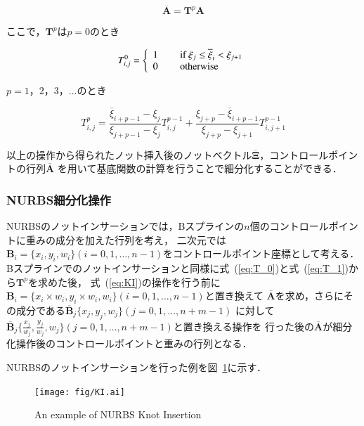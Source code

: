\begin{equation}
  \overline{\boldsymbol{A}} = \boldsymbol{T}^p\boldsymbol{A}
  \label{eq:KI}
\end{equation}

\noindent
ここで，$\boldsymbol{T}^p$は$p = 0$のとき

\begin{equation}
  T^0_{i,j} = \left \{
  \begin{array}{l}
    1    \ \qquad $if$\  \xi_{j} \leq \overline{\xi}_i < \xi_{j + 1} \\
    0    \ \qquad $otherwise$
  \end{array}
  \right.
  \label{eq:T_0}
\end{equation}

\noindent
$p = 1，2，3，\dots$のとき

\begin{equation}
  T^p_{i,j} = \frac{\overline{\xi}_{i+p-1} - \xi_j}{\xi_{j+p-1} - \xi_j}T^{p-1}_{i,j} 
  + \frac{\xi_{j+p} - \overline{\xi}_{i+p-1}}{\xi_{j+p} - \xi_{j + 1}}T^{p-1}_{i,j+1}
  \label{eq:T_1}
\end{equation}

\noindent
以上の操作から得られたノット挿入後のノットベクトル$\overline{\boldsymbol{\Xi}}$，コントロールポイントの行列$\overline{\boldsymbol{A}}$
を用いて基底関数の計算を行うことで細分化することができる．

\subsubsection{NURBS細分化操作}
NURBSのノットインサーションでは，Bスプラインの$n$個のコントロールポイントに重みの成分を加えた行列を考え，
二次元では$\boldsymbol{B}_i = \{x_i, y_i, w_i\}(i=0,1,\dots,n-1)$をコントロールポイント座標として考える．
Bスプラインでのノットインサーションと同様に式~(\ref{eq:T_0})と式~(\ref{eq:T_1})から$\boldsymbol{T}^p$を求めた後，
式~(\ref{eq:KI})の操作を行う前に$\boldsymbol{B}_i = \{x_i\times w_i, y_i\times w_i, w_i\}(i=0,1,\dots,n-1)$と置き換えて
$\overline{\boldsymbol{A}}$を求め，さらにその成分である$\overline{\boldsymbol{B}}_j\{x_j, y_j, w_j\}(j=0,1,\dots,n+m-1)$
に対して$\overline{\boldsymbol{B}}_j\{\frac{x_j}{w_j}, \frac{y_j}{w_j}, w_j\}(j=0,1,\dots,n+m-1)$と置き換える操作を
行った後の$\overline{\boldsymbol{A}}$が細分化操作後のコントロールポイントと重みの行列となる．

NURBSのノットインサーションを行った例を図~\ref{fig:KI}に示す．

\begin{figure}[htbp]
  \centering
  \texttt{[image: fig/KI.ai]}
  \caption{An example of NURBS Knot Insertion}
  \label{fig:KI}
\end{figure}

